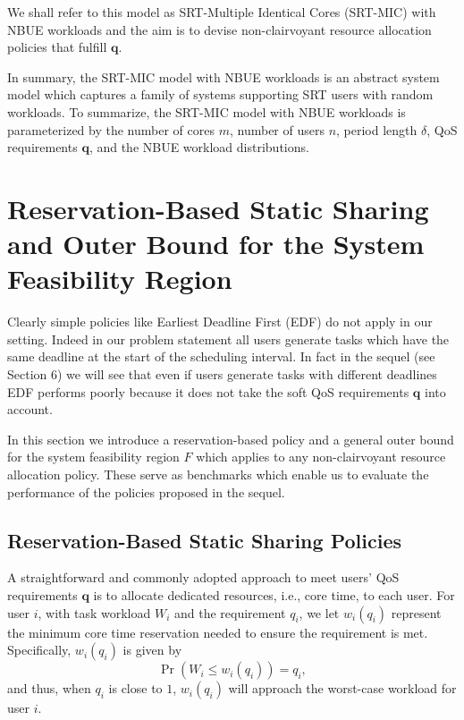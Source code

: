 \documentclass[prodmode,acmtompecs]{acmsmall}
\newcommand{\reqvec}{\mathbf{q}}
\newcommand{\reqscalar}{q}
\newcommand{\feasibilityRegion}{F}
\newcommand{\myComments}[1]{}
\newif\ifdissertation
\newcommand{\dissertationStart}{\ifdissertation  \myComments{Dissertation version: }}
\newcommand{\commentEnd}{\myComments{End}}
\newcommand{\add}[1]{#1}
\begin{document}
We shall refer to this model as SRT-Multiple Identical Cores (SRT-MIC) with NBUE workloads and the aim is to devise non-clairvoyant resource allocation policies that fulfill $\mathbf{q}$.

\dissertationStart
Note that different users may require different QoS $q$. For example, in the CRAN context, soft real-time tasks include subframe baseband processing which requires $\reqscalar$ close to $1$, and channel measurements, which only need to be updated every few subframes and require low $\reqscalar$, probably $50\%$. 
\commentEnd\fi

In summary, the SRT-MIC model with NBUE workloads is an abstract system model which captures a family of systems supporting SRT users with random workloads. 
To summarize, the SRT-MIC model with NBUE workloads is parameterized by the number of cores $m$, number of users $n$, period length $\delta$, QoS requirements $\reqvec$, and the NBUE workload distributions. 


\section{Reservation-Based Static Sharing and Outer Bound for the System Feasibility Region}
\dissertationStart
In the next few sections we will analyze and compare several resource allocation policies for the SRT-MIC systems with the aim of motivating good policies for more complicated practical systems.
\commentEnd\fi 
\add{Clearly simple policies like Earliest Deadline First (EDF) do not apply in our setting. Indeed in our problem statement all users generate tasks
which have the same deadline at the start of the scheduling interval. In fact in the sequel (see Section 6) we will see that even if users generate tasks with
different deadlines EDF performs poorly because it does not take the soft QoS requirements $\mathbf{q}$ into account.}

In this section we introduce a reservation-based policy and a general outer bound for the system feasibility region $\feasibilityRegion$ which applies to any non-clairvoyant resource allocation policy. These serve as benchmarks which enable us to evaluate the performance of the policies proposed in the sequel. 



\subsection{Reservation-Based Static Sharing Policies}
\label{subsection_reservation_based_design}
A straightforward and commonly adopted approach to meet users' QoS requirements $\reqvec$ is to allocate dedicated resources, i.e., core time, to each user. For user $i$, with task workload $W_i$ and the requirement $q_i$, we let $w_i(q_i)$ represent the minimum core time reservation needed to ensure the requirement is met. Specifically, $w_i(q_i)$ is given by
$$
\Pr(W_i \leq w_i(q_i)) = q_i, 
$$
and thus, when $q_i$ is close to $1$, $w_i(q_i)$ will approach the worst-case workload for user $i$. 
\end{document}
